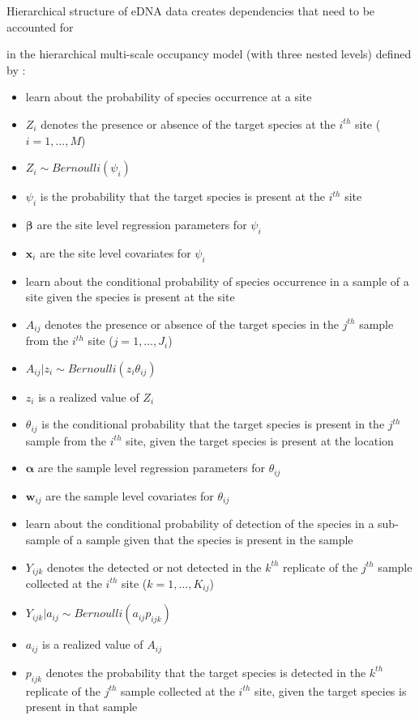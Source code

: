 \documentclass[12pt]{article}\usepackage[]{graphicx}\usepackage[]{color}
\begin{document}
Hierarchical structure of eDNA data creates dependencies that need to be accounted for \cite{MacKenzie}

in the hierarchical multi-scale occupancy model (with three nested levels) defined by \cite{Dorazio_Erickson}:
\begin{itemize}
\item learn about the probability of species occurrence at a site 
\item $Z_i$ denotes the presence or absence of the target species at the $i^{th}$ site ($i = 1, \dots, M$)
\item $Z_i \sim Bernoulli(\psi_i)$
\item $\psi_i$ is the probability that the target species is present at the $i^{th}$ site
\item $\bm{\beta}$ are the site level regression parameters for $\psi_i$
\item $\bm{x}_i$ are the site level covariates for $\psi_i$
\item learn about the conditional probability of species occurrence in a sample of a site given the species is present at the site
\item $A_{ij}$ denotes the presence or absence of the target species in the $j^{th}$ sample from the $i^{th}$ site ($j = 1, \dots, J_i$)
\item $A_{ij}|z_i \sim Bernoulli(z_i\theta_{ij})$
\item $z_i$ is a realized value of $Z_i$
\item $\theta_{ij}$ is the conditional probability that the target species is present in the $j^{th}$ sample from the $i^{th}$ site, given the target species is present at the location 
\item $\bm{\alpha}$ are the sample level regression parameters for $\theta_{ij}$
\item $\bm{w}_{ij}$ are the sample level covariates for $\theta_{ij}$
\item learn about the conditional probability of detection of the species in a sub-sample of a sample given that the species is present in the sample
\item $Y_{ijk}$ denotes the detected or not detected in the $k^{th}$ replicate of the $j^{th}$ sample collected at the $i^{th}$ site ($k = 1, \dots, K_{ij}$)
\item $Y_{ijk}|a_{ij} \sim Bernoulli(a_{ij}p_{ijk})$
\item $a_{ij}$ is a realized value of $A_{ij}$
\item $p_{ijk}$ denotes the probability that the target species is detected in the $k^{th}$ replicate of the $j^{th}$ sample collected at the $i^{th}$ site, given the target species is present in that sample

\end{itemize}
\end{document}
